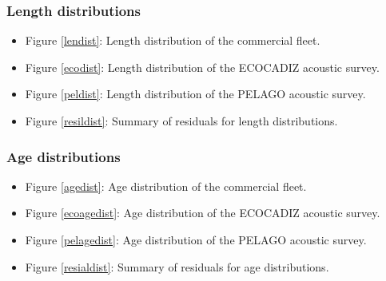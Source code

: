 \documentclass[review]{elsarticle}
\begin{document}
\subsubsection*{Length distributions}
\begin{itemize}
\item Figure \ref{lendist}: Length distribution of the commercial fleet.
\item Figure \ref{ecodist}: Length distribution of the ECOCADIZ acoustic survey. 
\item Figure \ref{peldist}: Length distribution of the PELAGO acoustic survey.
\item Figure \ref{resildist}: Summary of residuals for length distributions.
\end{itemize}
\subsubsection*{Age distributions}
\begin{itemize}
\item Figure \ref{agedist}: Age distribution of the commercial fleet.
\item Figure \ref{ecoagedist}: Age distribution of the ECOCADIZ acoustic survey. 
\item Figure \ref{pelagedist}: Age distribution of the PELAGO acoustic survey.
\item Figure \ref{resialdist}: Summary of residuals for age distributions.
\end{itemize}


\end{document}
